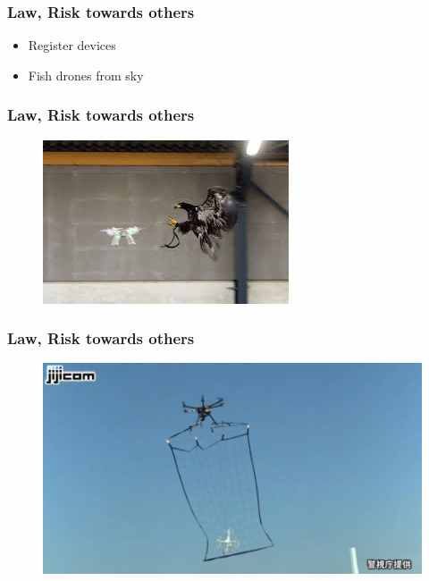 \begin{frame}
\frametitle{Law, Risk towards others}

  \begin{itemize}
    \item Register devices    
	\item Fish drones from sky
  \end{itemize}
  	
\end{frame}



\begin{frame}
\frametitle{Law, Risk towards others}
  
  \begin{figure}
  \includegraphics[scale=0.9]{pic/03_our-copter/eagle.jpeg}
  \end{figure}

\end{frame}



\begin{frame}
\frametitle{Law, Risk towards others}
  
  \begin{figure}
  \includegraphics[scale=0.31]{pic/03_our-copter/net.jpg}
  \end{figure}

\end{frame}



